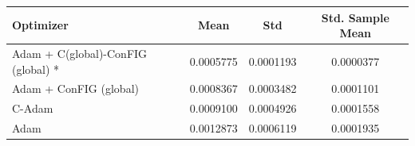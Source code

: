 \begin{table}[H]
    \centering
    \label{tab:optimizer_results}
    \begin{tabular}{lccc}
        \toprule
        \textbf{Optimizer} & \textbf{Mean} & \textbf{Std} & \textbf{Std. Sample Mean} \\
        \midrule
        Adam + C(global)-ConFIG (global) * & 0.0005775 & 0.0001193 & 0.0000377 \\
        Adam + ConFIG (global) & 0.0008367 & 0.0003482 & 0.0001101 \\
        C-Adam & 0.0009100 & 0.0004926 & 0.0001558 \\
        Adam & 0.0012873 & 0.0006119 & 0.0001935 \\
        \bottomrule
    \end{tabular}
\end{table}
